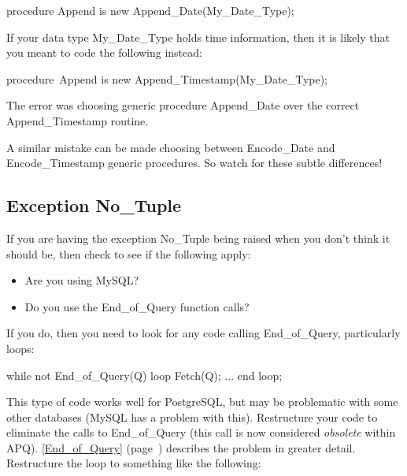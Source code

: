 \documentclass[english,letterpaper]{book}
\newcommand\Ref[1]{\textsection\ref{#1} (page~\pageref{#1})}
\begin{document}
\begin{Code}

   procedure Append
      is new Append_Date(My_Date_Type);

\end{Code}

If your data type My\_Date\_Type holds time information, then
it is likely that you meant to code the following instead:

\begin{Code}

   procedure~Append
      is new Append_Timestamp(My_Date_Type);

\end{Code}

The error was choosing generic procedure Append\_Date over the correct
Append\_Timestamp routine.

A similar mistake can be made choosing between Encode\_Date and Encode\_Timestamp
generic procedures. So watch for these subtle differences!


\subsection{Exception No\_Tuple}

If you are having the exception No\_Tuple being raised when you don't
think it should be, then check to see if the following apply:

\begin{itemize}
   \item Are you using MySQL?
   \item Do you use the End\_of\_Query function calls?
\end{itemize}

If you do, then you need to look for any code calling End\_of\_Query,
particularly loops:

\begin{Example}
   while not End_of_Query(Q) loop
      Fetch(Q);
      ...
   end loop;
\end{Example}

This type of code works well for PostgreSQL, but may be problematic
with some other databases (MySQL has a problem with this). Restructure
your code to eliminate the calls to End\_of\_Query (this call is now
considered \emph{obsolete} within APQ). \Ref{End_of_Query}
describes the problem in greater detail. Restructure the loop to something
like the following:
\end{document}
